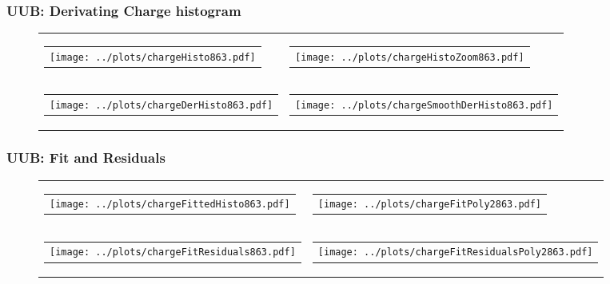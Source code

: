 \documentclass[aspectratio=169]{beamer}
\begin{document}
\begin{frame}
  \frametitle{UUB: Derivating Charge histogram} %
  \begin{figure}
    \centering
    \begin{tabularx}{\textwidth}{CC}
      \begin{tabular}{l}
        \texttt{[image: ../plots/chargeHisto863.pdf]}
      \end{tabular}
      &
      \begin{tabular}{l}
        \texttt{[image: ../plots/chargeHistoZoom863.pdf]}
      \end{tabular}
      \\
      \begin{tabular}{l}
        \texttt{[image: ../plots/chargeDerHisto863.pdf]}
      \end{tabular}
      &
      \begin{tabular}{l}
        \texttt{[image: ../plots/chargeSmoothDerHisto863.pdf]}
      \end{tabular}
    \end{tabularx}
  \end{figure}
\end{frame}


\begin{frame}
  \frametitle{UUB: Fit and Residuals}
  \begin{figure}
    \centering
    \begin{tabularx}{\textwidth}{CC}
      \begin{tabular}{l}
        \texttt{[image: ../plots/chargeFittedHisto863.pdf]}
      \end{tabular}
      &
      \begin{tabular}{l}
        \texttt{[image: ../plots/chargeFitPoly2863.pdf]}
      \end{tabular}
      \\
      \begin{tabular}{l}
        \texttt{[image: ../plots/chargeFitResiduals863.pdf]}
      \end{tabular}
      &
      \begin{tabular}{l}
        \texttt{[image: ../plots/chargeFitResidualsPoly2863.pdf]}
      \end{tabular}
    \end{tabularx}
  \end{figure}
\end{frame}
\end{document}

